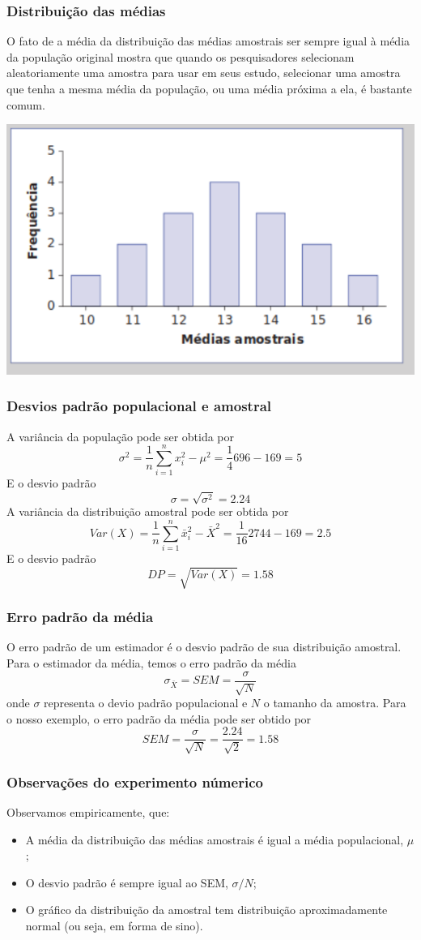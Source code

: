 \documentclass[11pt]{beamer}
\begin{document}
\begin{frame}
\frametitle{Distribuição das médias}
O fato de a média da distribuição das médias amostrais ser sempre igual à média da população original mostra que quando os pesquisadores selecionam aleatoriamente uma amostra para usar em seus estudo, selecionar uma amostra que tenha a mesma média da população, ou uma média próxima a ela, é bastante comum.
\begin{center}\includegraphics[width=0.6\linewidth]{figs/chap5fig5.1} \end{center}

\end{frame}

\begin{frame}
\frametitle{Desvios padrão populacional e amostral}
A variância da população pode ser obtida por
\[\sigma^2 = \frac{1}{n}\sum_{i=1}^n x_i^2 - \mu^2=\frac{1}{4}696-169=5\]
E o desvio padrão
\[\sigma= \sqrt{\sigma^2} = 2.24\]
A variância da distribuição amostral pode ser obtida por
\[Var(X) = \frac{1}{n}\sum_{i=1}^n \bar{x}_i^2 - \bar{X}^2=\frac{1}{16}2744-169=2.5\]
E o desvio padrão
\[DP = \sqrt{Var(X)} = 1.58\]
\end{frame}

\begin{frame}
\frametitle{Erro padrão da média}
O erro padrão de um estimador é o desvio padrão de sua distribuição amostral. Para o estimador da média, temos o erro padrão da média
\[\sigma_{\bar{X}} = SEM = \frac{\sigma}{\sqrt{N}}\]
onde \(\sigma\) representa o devio padrão populacional e \(N\) o tamanho da amostra.
Para o nosso exemplo, o erro padrão da média pode ser obtido por
\[SEM = \frac{\sigma}{\sqrt{N}} = \frac{2.24}{\sqrt{2}}=1.58\]

\end{frame}

\begin{frame}
\frametitle{Observações do experimento númerico}
Observamos empiricamente, que:
\begin{itemize}
\item A média da distribuição das médias amostrais é igual a média populacional, \(\mu\);
\item O desvio padrão é sempre igual ao SEM, \(\sigma/N\);
\item O gráfico da distribuição da amostral tem distribuição aproximadamente normal (ou seja, em forma de sino).
\end{itemize}

\end{frame}
\end{document}
